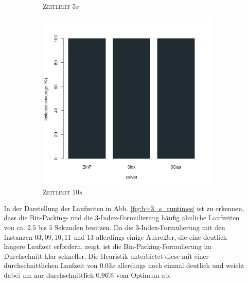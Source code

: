 \begin{figure}[H]
\begin{subfigure}[b]{0.3\textwidth}
\caption{\textsc{Zeitlimit} $5s$}
\label{fig:instance_coverage_b=3_s_b}
\end{subfigure}
\hfill
\begin{subfigure}[b]{0.3\textwidth}
\centering
\includegraphics[width=1.2\textwidth]{img/solver_instance_coverage_b=3_s_10s.png}
\caption{\textsc{Zeitlimit} $10s$}
\label{fig:instance_coverage_b=3_s_c}
\end{subfigure}

\caption{}
\label{fig:instance_coverage_b=3_s}
\end{figure}

In der Darstellung der Laufzeiten in Abb. \ref{fig:b=3_s_runtimes} ist zu erkennen, dass die Bin-Packing-
und die 3-Index-Formulierung häufig ähnliche Laufzeiten von ca. $2.5$ bis $5$ Sekunden besitzen.
Da die 3-Index-Formulierung mit den Instanzen $03, 09, 10, 11$ und $13$ allerdings einige Ausreißer,
die eine deutlich längere Laufzeit erfordern, zeigt, ist die Bin-Packing-Formulierung im Durchschnitt klar schneller.
Die Heuristik unterbietet diese mit einer durchschnittlichen Laufzeit von $0.03s$ allerdings noch einmal deutlich
und weicht dabei um nur durchschnittlich $0.96 \%$ vom Optimum ab.

